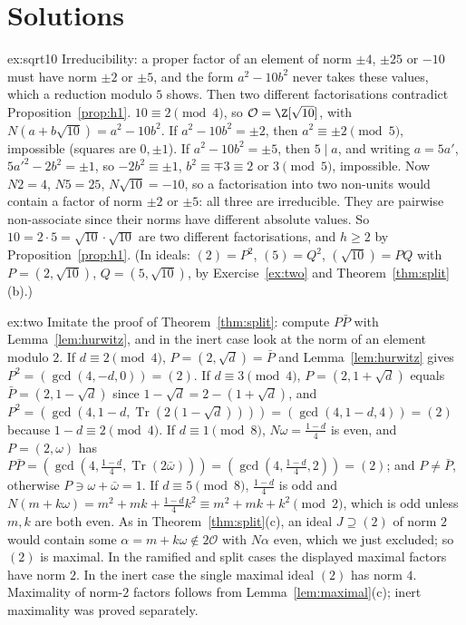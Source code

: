 \section{Solutions}

\begin{solution}{ex:sqrt10}
\idea Irreducibility: a proper factor of an element of norm $\pm4$, $\pm25$ or $-10$ must have norm $\pm2$ or $\pm5$, and the form $a^2-10b^2$ never takes these values, which a reduction modulo $5$ shows. Then two different factorisations contradict Proposition~\ref{prop:h1}.
\writeup $10\equiv2\pmod4$, so $\mathcal O=\Z[\sqrt{10}]$, with $N(a+b\sqrt{10})=a^2-10b^2$. If $a^2-10b^2=\pm2$, then $a^2\equiv\pm2\pmod5$, impossible (squares are $0,\pm1$). If $a^2-10b^2=\pm5$, then $5\mid a$, and writing $a=5a'$, $5a'^2-2b^2=\pm1$, so $-2b^2\equiv\pm1$, $b^2\equiv\mp3\equiv2$ or $3\pmod5$, impossible. Now $N2=4$, $N5=25$, $N\sqrt{10}=-10$, so a factorisation into two non-units would contain a factor of norm $\pm2$ or $\pm5$: all three are irreducible. They are pairwise non-associate since their norms have different absolute values. So $10=2\cdot5=\sqrt{10}\cdot\sqrt{10}$ are two different factorisations, and $h\ge2$ by Proposition~\ref{prop:h1}. (In ideals: $(2)=P^2$, $(5)=Q^2$, $(\sqrt{10})=PQ$ with $P=(2,\sqrt{10})$, $Q=(5,\sqrt{10})$, by Exercise~\ref{ex:two} and Theorem~\ref{thm:split}(b).)
\end{solution}

\begin{solution}{ex:two}
\idea Imitate the proof of Theorem~\ref{thm:split}: compute $P\bar P$ with Lemma~\ref{lem:hurwitz}, and in the inert case look at the norm of an element modulo $2$.
\writeup If $d\equiv2\pmod4$, $P=(2,\sqrt d)=\bar P$ and Lemma~\ref{lem:hurwitz} gives $P^2=(\gcd(4,-d,0))=(2)$. If $d\equiv3\pmod4$, $P=(2,1+\sqrt d)$ equals $\bar P=(2,1-\sqrt d)$ since $1-\sqrt d=2-(1+\sqrt d)$, and $P^2=(\gcd(4,1-d,\operatorname{Tr}(2(1-\sqrt d))))=(\gcd(4,1-d,4))=(2)$ because $1-d\equiv2\pmod4$. If $d\equiv1\pmod8$, $N\omega=\frac{1-d}4$ is even, and $P=(2,\omega)$ has $P\bar P=(\gcd(4,\frac{1-d}4,\operatorname{Tr}(2\bar\omega)))=(\gcd(4,\tfrac{1-d}4,2))=(2)$; and $P\ne\bar P$, otherwise $P\ni\omega+\bar\omega=1$. If $d\equiv5\pmod8$, $\frac{1-d}4$ is odd and $N(m+k\omega)=m^2+mk+\frac{1-d}4k^2\equiv m^2+mk+k^2\pmod2$, which is odd unless $m,k$ are both even. As in Theorem~\ref{thm:split}(c), an ideal $J\supseteq(2)$ of norm $2$ would contain some $\alpha=m+k\omega\notin2\mathcal O$ with $N\alpha$ even, which we just excluded; so $(2)$ is maximal. In the ramified and split cases the displayed maximal factors have norm $2$. In the inert case the single maximal ideal $(2)$ has norm $4$. Maximality of norm-$2$ factors follows from Lemma~\ref{lem:maximal}(c); inert maximality was proved separately.
\end{solution}

